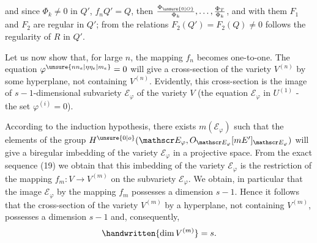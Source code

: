 and since $\Phi_k\ne 0$ in $Q'$, $f_nQ'=Q$, then $\frac{\Phi_{\unsure{0|O}}}{\Phi_k},\ldots,\frac{\Phi_T}{\Phi_k}$, and
with them $F_1$ and $F_2$ are regular in $Q'$; from the relations
$F_2(Q')=F_2(Q)\ne 0$ follows the regularity of $R$ in $Q'$.

Let us now show that, for large $n$, the mapping $f_n$
becomes one-to-one. The equation $\varphi^{\unsure{nn_e|\eta\eta_e|m_e}}=0$ will give a
cross-section of the variety $V^{(n)}$ by some hyperplane, not
containing $V^{(n)}$. Evidently, this cross-section is the image
of $s-1$-dimensional subvariety $\mathscr E_{\varphi}$ of the variety $V$
(the equation $\mathscr E_{\varphi}$ in $U^{(1)}$ - the set $\varphi^{(i)}=0$).

According to the induction hypothesis, there exists
$m(\mathscr E_{\varphi})$ such that the elements of the group 
$H^{\unsure{0|o}}(\mathscr E_{\varphi},O_{\mathscr E_{\varphi}}[mE']_{\mathscr E_{\varphi}})$ will give a biregular imbedding of
the variety $\mathscr E_{\varphi}$ in a projective space. From the exact
sequence (19) we obtain that this imbedding of the variety
$\mathscr E_{\varphi}$ is the restriction of the mapping $f_m\colon V\to V^{(m)}$ on
the subvariety $\mathscr E_{\varphi}$. We obtain, in particular that the
image $\mathscr E_{\varphi}$ by the mapping $f_m$ possesses a dimension $s-1$.
Hence it follows that the cross-section of the variety $V^{(m)}$
by a hyperplane, not containing $V^{(m)}$, possesses a dimension
$s-1$ and, consequently,
\[
\handwritten{\dim V^{(m)}}=s.
\]
